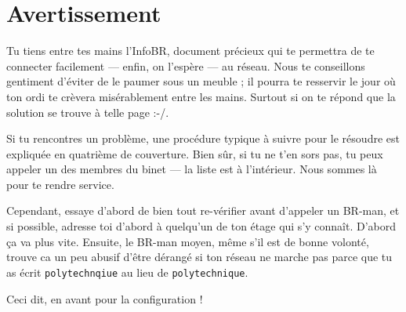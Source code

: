 \thispagestyle{empty}


\section*{Avertissement}

Tu tiens entre tes mains l'InfoBR, document pr\'ecieux qui te permettra de te connecter facilement
--- enfin, on l'esp\`ere --- au r\'eseau.
Nous te conseillons gentiment d'\'eviter de le paumer sous un meuble ; il pourra te resservir le jour o\`u ton ordi te cr\`evera mis\'erablement entre les
mains. Surtout si on te r\'epond que la solution se trouve \`a telle page :-/.

Si tu rencontres un probl\`eme, une proc\'edure typique \`a suivre pour le r\'esoudre est expliqu\'ee en quatri\`eme de couverture.
Bien sûr, si tu ne t'en sors pas, tu peux appeler un des membres du binet --- la liste est \`a l'int\'erieur.
Nous sommes l\`a pour te rendre service.

Cependant, essaye d'abord de bien tout re-v\'erifier avant d'appeler un BR-man, et si possible, adresse toi d'abord \`a quelqu'un de ton \'etage qui s'y
connaît. D'abord ça va plus vite. Ensuite, le BR-man moyen, m\^eme s'il est de bonne volont\'e, trouve ca un peu abusif d'\^etre d\'erang\'e si ton r\'eseau ne
marche pas parce que tu as \'ecrit \texttt{polytechnqiue} au lieu de \texttt{polytechnique}.

Ceci dit, en avant pour la configuration !

